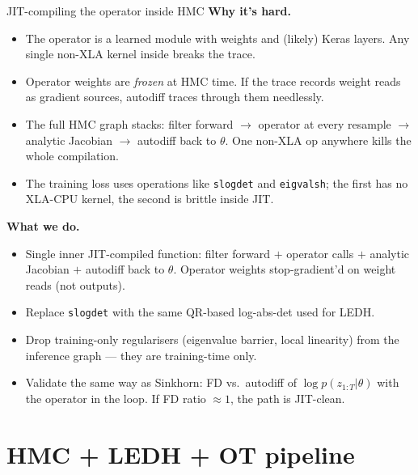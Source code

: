 \documentclass[10pt,aspectratio=169]{beamer}
\begin{document}
\begin{frame}{JIT-compiling the operator inside HMC}
  \textbf{Why it's hard.}
  \begin{itemize}\setlength{\itemsep}{0.2em}
    \item The operator is a learned module with weights and (likely) Keras layers. Any single non-XLA kernel inside breaks the trace.
    \item Operator weights are \emph{frozen} at HMC time. If the trace records weight reads as gradient sources, autodiff traces through them needlessly.
    \item The full HMC graph stacks: filter forward $\to$ operator at every resample $\to$ analytic Jacobian $\to$ autodiff back to $\theta$. One non-XLA op anywhere kills the whole compilation.
    \item The training loss uses operations like \texttt{slogdet} and \texttt{eigvalsh}; the first has no XLA-CPU kernel, the second is brittle inside JIT.
  \end{itemize}

  \medskip
  \textbf{What we do.}
  \begin{itemize}\setlength{\itemsep}{0.2em}
    \item Single inner JIT-compiled function: filter forward $+$ operator calls $+$ analytic Jacobian $+$ autodiff back to $\theta$. Operator weights stop-gradient'd on weight reads (not outputs).
    \item Replace \texttt{slogdet} with the same QR-based log-abs-det used for LEDH.
    \item Drop training-only regularisers (eigenvalue barrier, local linearity) from the inference graph --- they are training-time only.
    \item Validate the same way as Sinkhorn: FD vs.\ autodiff of $\log p(z_{1:T} | \theta)$ with the operator in the loop. If FD ratio $\approx 1$, the path is JIT-clean.
  \end{itemize}
\end{frame}

\section{HMC + LEDH + OT pipeline}
\end{document}
